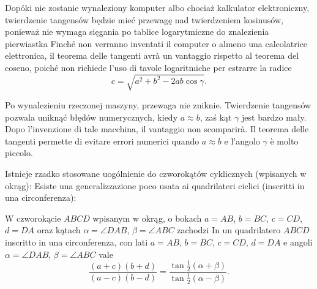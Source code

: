 Dopóki nie zostanie wynaleziony komputer albo chociaż kalkulator elektroniczny, twierdzenie tangensów będzie mieć przewagę nad twierdzeniem kosinusów, ponieważ nie wymaga sięgania po tablice logarytmiczne do znalezienia pierwiastka %
Finché non verranno inventati il computer o almeno una calcolatrice elettronica, il teorema delle tangenti avrà un vantaggio rispetto al teorema del coseno, poiché non richiede l’uso di tavole logaritmiche per estrarre la radice %
%
\begin{equation}
c = \sqrt{a^2 + b^2 - 2 a b \cos \gamma}.
\end{equation}

Po wynalezieniu rzeczonej maszyny, przewaga nie zniknie. %
Twierdzenie tangensów pozwala uniknąć błędów numerycznych, kiedy $a \approx b$, zaś kąt $\gamma$ jest bardzo mały. %
Dopo l’invenzione di tale macchina, il vantaggio non scomparirà. %
Il teorema delle tangenti permette di evitare errori numerici quando $a \approx b$ e l’angolo $\gamma$ è molto piccolo. %

Istnieje rzadko stosowane uogólnienie do czworokątów cyklicznych (wpisanych w okrąg): %
Esiste una generalizzazione poco usata ai quadrilateri ciclici (inscritti in una circonferenza): %

\begin{proposition}
	W czworokącie $ABCD$ wpisanym w okrąg, o bokach $a = AB$, $b = BC$, $c = CD$, $d = DA$ oraz kątach $\alpha = \angle DAB$, $\beta = \angle ABC$ zachodzi %
	In un quadrilatero $ABCD$ inscritto in una circonferenza, con lati $a = AB$, $b = BC$, $c = CD$, $d = DA$ e angoli $\alpha = \angle DAB$, $\beta = \angle ABC$ vale %
	\begin{equation}
		\frac{(a+c)(b+d)}{(a-c)(b-d)} = \frac{\tan \frac 1 2 (\alpha + \beta)}{\tan \frac 1 2 (\alpha - \beta)}.
	\end{equation}
\end{proposition}

%